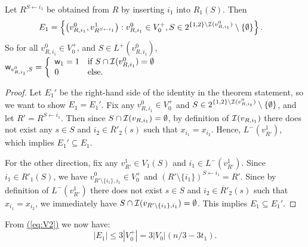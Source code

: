 \documentclass{theoretics}
\newcommand{\eq}[1]{\hyperref[eq:#1]{(\ref*{eq:#1})}}
\renewcommand{\>}{\rangle}
\newcommand{\<}{\langle}
\renewcommand{\(}{\left(}
\renewcommand{\)}{\right)}
\def\w{{\sf w}}
\begin{document}
\begin{lemma}\label{lem:3-dist-E1}
	Let $R^{S \leftarrow i_1}$ be obtained from $R$ by inserting $i_1$ into $R_1(S)$. Then
	\begin{align*}
		E_1 &= \left\{\left(v^{0}_{R,i_1},v^{1}_{R^{S \leftarrow i_1}}\right): v_{R,i_1}^0\in V_0^+, S \in 2^{\{1,2\}\setminus {\cal I}(v_{R,i_1}^0)}\setminus \{\emptyset\} \right\}.\label{eq:3-dist-E1}
	\end{align*}
	So for all $v^0_{R,i_1}\in V_0^+$, and $S\in L^+(v^0_{R,i_1})$,
	$\displaystyle\w_{v^0_{R,i_1},S} = \left\{\begin{array}{ll}
		\w_1 =1 & \mbox{if }S\cap {\cal I}(v^0_{R,i_1}) = \emptyset\\
		0 & \mbox{else.}
	\end{array}\right.$
\end{lemma}

\begin{proof}
	Let $E_1'$ be the right-hand side of the identity in the theorem statement, so we want to show $E_1=E_1'$. 
	Fix any $v_{R,i_1}^0\in V_0^+$ and $S \in 2^{\{1,2\}\setminus {\cal I}(v_{R,i_1}^0)}\setminus \{\emptyset\}$, and let $R'=R^{S\leftarrow i_1}$. Then since $S\cap {\cal I}(v_{R,i_1})=\emptyset$, by definition of ${\cal I}(v_{R,i_1})$ there does not exist any $s \in S$ and $i_2\in \overline{R}'_2(s)$ such that $x_{i_1}=x_{i_2}$. Hence, $L^-(v_{R'}^1)$, which implies $E_1'\subseteq E_1$.
	
	For the other direction, fix any $v_{R'}^1\in V_1(S)$ and $i_1\in L^-(v_{R'}^1)$. Since $i_1\in R'_1(S)$, we have $v^0_{R' \setminus \{i_1\},i_1}\in V_0^+$ and $(R'\setminus\{i_1\})^{S\leftarrow i_1}=R'$. Since by definition of $L^-(v_{R'}^1)$ there does not exist $s \in S$ and $i_2\in \overline{R}'_2(s)$ such that $x_{i_1}=x_{i_2}$, we immediately have $S\cap {\cal I}(v_{R'\setminus\{i_1\},i_1})=\emptyset$. This implies $E_1\subseteq E_1'$.
\end{proof}

\noindent From \eq{V2} we now have:
\begin{equation}
|E_1|\leq 3|V_0^+|=3|V_0|(n/3-3t_1).\label{eq:E2}
\end{equation}
\end{document}
